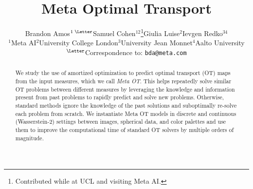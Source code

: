 \documentclass{article}
\begin{document}
\title{Meta Optimal Transport}
\author{Brandon Amos$^{1\;\textrm{\normalfont\Letter}}$\qquad {}Samuel Cohen$^{12}$\thanks{Contributed while at UCL and visiting Meta AI.}\qquad Giulia Luise$^2$\qquad Ievgen Redko$^{34}$ \\
  $^1$Meta AI\quad $^2$University College London\quad $^3$University Jean Monnet\quad $^4$Aalto University \\
  $^\textrm{\Letter}$\hspace{0.5mm}Correspondence to: \texttt{bda@meta.com}}
\maketitle

\begin{abstract}
  We study the use of amortized optimization to predict optimal transport (OT) maps
  from the input measures, which we call \emph{Meta OT}.
  This helps repeatedly solve similar OT problems between different
  measures by leveraging the knowledge and information present
  from past problems to rapidly predict and solve new problems.
  Otherwise, standard methods ignore the knowledge of the
  past solutions and suboptimally re-solve each problem from scratch.
  We instantiate Meta OT models in discrete and continuous (Wasserstein-2)
  settings between images, spherical data, and color palettes and
  use them to improve the computational time of standard OT solvers
  by multiple orders of magnitude.
\end{abstract}
\end{document}
